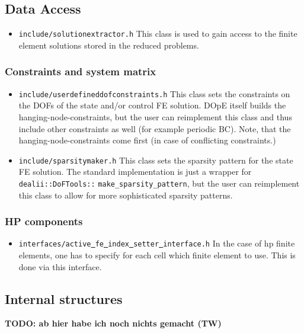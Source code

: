 \documentclass[prodmode,acmtoms]{acmsmall}
\numberwithin{equation}{section}
\begin{document}
\subsection{Data Access}
\begin{itemize}
\item \texttt{include/solutionextractor.h} This class is used to gain access to the finite element 
  solutions stored in the reduced problems.
\end{itemize}

\subsubsection{Constraints and system matrix}
\begin{itemize}
\item \texttt{include/userdefineddofconstraints.h} This class sets the constraints on the DOFs of the state and/or control FE solution. DOpE itself builds the hanging-node-constraints, but the user can reimplement this class and thus include other constraints as well (for example periodic BC). Note, that the hanging-node-constraints come first (in case of conflicting constraints.)
\item \texttt{include/sparsitymaker.h} This class sets the sparsity pattern for the state FE solution. The standard implementation is just a wrapper for \texttt{dealii::DoFTools::} \texttt{make\_sparsity\_pattern}, but the user can reimplement this class to allow for more sophisticated sparsity patterns.
\end{itemize}

\subsubsection{HP components}
\begin{itemize}
\item \texttt{interfaces/active\underline{ }fe\underline{ }index\underline{ }setter\underline{ }interface.h} In the case of hp finite elements, one has to specify for each cell which finite element to use. This is done via this interface.
\end{itemize}

\subsection{Internal structures}
{\bf TODO: ab hier habe ich noch nichts gemacht (TW)}
\end{document}
